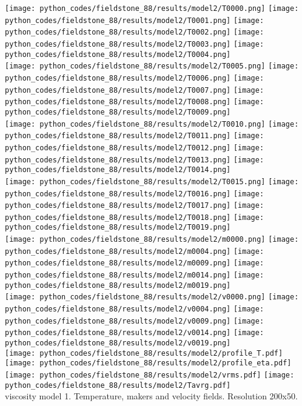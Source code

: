 \begin{center}
\texttt{[image: python\_codes/fieldstone\_88/results/model2/T0000.png]}
\texttt{[image: python\_codes/fieldstone\_88/results/model2/T0001.png]}
\texttt{[image: python\_codes/fieldstone\_88/results/model2/T0002.png]}
\texttt{[image: python\_codes/fieldstone\_88/results/model2/T0003.png]}
\texttt{[image: python\_codes/fieldstone\_88/results/model2/T0004.png]}\\
\texttt{[image: python\_codes/fieldstone\_88/results/model2/T0005.png]}
\texttt{[image: python\_codes/fieldstone\_88/results/model2/T0006.png]}
\texttt{[image: python\_codes/fieldstone\_88/results/model2/T0007.png]}
\texttt{[image: python\_codes/fieldstone\_88/results/model2/T0008.png]}
\texttt{[image: python\_codes/fieldstone\_88/results/model2/T0009.png]}\\
\texttt{[image: python\_codes/fieldstone\_88/results/model2/T0010.png]}
\texttt{[image: python\_codes/fieldstone\_88/results/model2/T0011.png]}
\texttt{[image: python\_codes/fieldstone\_88/results/model2/T0012.png]}
\texttt{[image: python\_codes/fieldstone\_88/results/model2/T0013.png]}
\texttt{[image: python\_codes/fieldstone\_88/results/model2/T0014.png]}\\
\texttt{[image: python\_codes/fieldstone\_88/results/model2/T0015.png]}
\texttt{[image: python\_codes/fieldstone\_88/results/model2/T0016.png]}
\texttt{[image: python\_codes/fieldstone\_88/results/model2/T0017.png]}
\texttt{[image: python\_codes/fieldstone\_88/results/model2/T0018.png]}
\texttt{[image: python\_codes/fieldstone\_88/results/model2/T0019.png]}\\
\texttt{[image: python\_codes/fieldstone\_88/results/model2/m0000.png]}
\texttt{[image: python\_codes/fieldstone\_88/results/model2/m0004.png]}
\texttt{[image: python\_codes/fieldstone\_88/results/model2/m0009.png]}
\texttt{[image: python\_codes/fieldstone\_88/results/model2/m0014.png]}
\texttt{[image: python\_codes/fieldstone\_88/results/model2/m0019.png]}\\
\texttt{[image: python\_codes/fieldstone\_88/results/model2/v0000.png]}
\texttt{[image: python\_codes/fieldstone\_88/results/model2/v0004.png]}
\texttt{[image: python\_codes/fieldstone\_88/results/model2/v0009.png]}
\texttt{[image: python\_codes/fieldstone\_88/results/model2/v0014.png]}
\texttt{[image: python\_codes/fieldstone\_88/results/model2/v0019.png]}\\
\texttt{[image: python\_codes/fieldstone\_88/results/model2/profile\_T.pdf]}
\texttt{[image: python\_codes/fieldstone\_88/results/model2/profile\_eta.pdf]}
\texttt{[image: python\_codes/fieldstone\_88/results/model2/vrms.pdf]}
\texttt{[image: python\_codes/fieldstone\_88/results/model2/Tavrg.pdf]}\\
{\captionfont viscosity model 1. Temperature, makers and velocity fields. Resolution 200x50.}
\end{center} 
